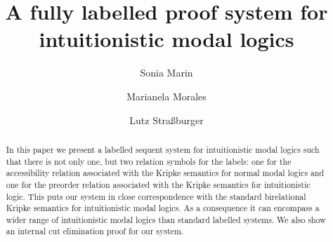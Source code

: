 \documentclass[a4paper]{article}
\title{A fully labelled proof system for intuitionistic modal logics}
\author{Sonia Marin \and %
	Marianela Morales %
	\and
	Lutz Stra{\ss}burger }
\begin{document}
  \maketitle
  
 \begin{abstract}
   In this paper we present a labelled sequent system for
   intuitionistic modal logics such that there is not only one, but
   two relation symbols for the labels: one for the accessibility
   relation associated with the Kripke semantics for normal modal logics and
   one for the preorder relation associated with the Kripke semantics
   for intuitionistic logic.
   This puts our system in close correspondence with the standard
   birelational Kripke semantics for intuitionistic modal logics. As a
   consequence it can encompass a wider range of intuitionistic modal
   logics than standard labelled systems.
   We also show an internal cut elimination proof for our system.
 \end{abstract}












\end{document}
